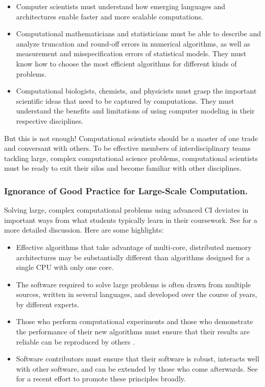 \documentclass[11pt]{NSFamsart}
\begin{document}
\begin{itemize}
\item Computer scientists must understand how emerging languages and architectures enable faster and more scalable computations.  

\item Computational mathematicians and statisticians must be able to describe and analyze truncation and round-off errors in numerical algorithms, as well as measurement and misspecification errors of statistical models.  They must know how to choose the most efficient algorithms for different kinds of problems.

\item Computational biologists, chemists, and physicists must grasp the important scientific ideas that need to be captured by computations.  They must understand the benefits and limitations of using computer modeling in their respective disciplines.

\end{itemize}
But this is not enough!  Computational scientists should be a master of one trade and conversant with others.  To be effective members of interdisciplinary teams tackling large, complex computational science problems, computational scientists must be ready to exit their silos and become familiar with other disciplines.

\subsubsection*{Ignorance of Good Practice for Large-Scale Computation.}  Solving large, complex computational problems using advanced CI deviates in important ways from what students typically learn in their coursework. See \cite[Sect.\ 2.4]{RudEtal18a} for a more detailed discussion.  Here are some highlights:

\begin{itemize}

\item Effective algorithms that take advantage of multi-core, distributed memory architectures may be substantially different than algorithms designed for a single CPU with only one core.

\item The software required to solve large problems is often drawn from multiple sources, written in several languages, and developed over the course of years, by different experts.

\item Those who perform computational experiments and those who demonstrate the performance of their new algorithms must ensure that their results are reliable can be reproduced by others \cite{Pen11}.  

\item Software contributors must ensure that their software is robust, interacts well with other software, and can be extended by those who come afterwards.  See \cite{BSS18} for a recent effort to promote these principles broadly.

\end{itemize}
\end{document}
